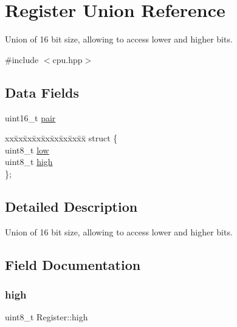 \hypertarget{unionRegister}{}\section{Register Union Reference}
\label{unionRegister}


Union of 16 bit size, allowing to access lower and higher bits.  




{\ttfamily \#include $<$cpu.\+hpp$>$}

\subsection*{Data Fields}
\begin{DoxyCompactItemize}
\item 
uint16\+\_\+t \mbox{\hyperlink{unionRegister_aac323348d1529a834f8b013deecf048c}{pair}}
\item 
\mbox{\label{unionRegister_a3d15b31854b2177c78cc4240849ce47e}} 
\begin{tabbing}
xx\=xx\=xx\=xx\=xx\=xx\=xx\=xx\=xx\=\kill
struct \{\\
\>uint8\_t \mbox{\hyperlink{unionRegister_ab3de0c995f96ded882a98602123a2d0a}{low}}\\
\>uint8\_t \mbox{\hyperlink{unionRegister_a65679413f32b134cc09b07783a772c75}{high}}\\
\}; \\

\end{tabbing}\end{DoxyCompactItemize}


\subsection{Detailed Description}
Union of 16 bit size, allowing to access lower and higher bits. 

\subsection{Field Documentation}
\mbox{\label{unionRegister_a65679413f32b134cc09b07783a772c75}} 
\subsubsection{\texorpdfstring{high}{high}}
{\footnotesize\ttfamily uint8\+\_\+t Register\+::high}

